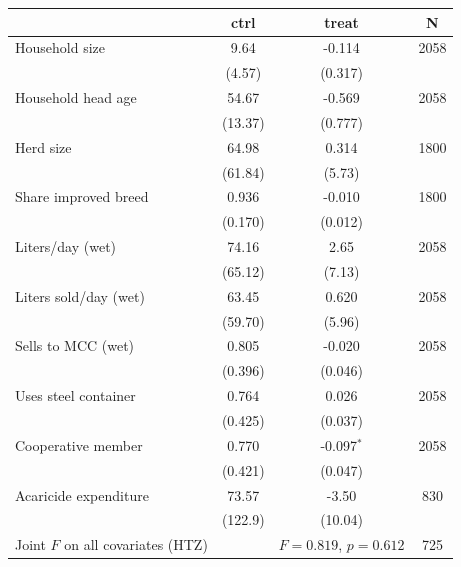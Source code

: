 \begin{tabular}{lccc}
\hline\hline
 & ctrl & treat & N \\
\hline
Household size & 9.64 & -0.114 & 2058 \\
 & (4.57) & (0.317) & \\
Household head age & 54.67 & -0.569 & 2058 \\
 & (13.37) & (0.777) & \\
Herd size & 64.98 & 0.314 & 1800 \\
 & (61.84) & (5.73) & \\
Share improved breed & 0.936 & -0.010 & 1800 \\
 & (0.170) & (0.012) & \\
Liters/day (wet) & 74.16 & 2.65 & 2058 \\
 & (65.12) & (7.13) & \\
Liters sold/day (wet) & 63.45 & 0.620 & 2058 \\
 & (59.70) & (5.96) & \\
Sells to MCC (wet) & 0.805 & -0.020 & 2058 \\
 & (0.396) & (0.046) & \\
Uses steel container & 0.764 & 0.026 & 2058 \\
 & (0.425) & (0.037) & \\
Cooperative member & 0.770 & -0.097$^{*}$ & 2058 \\
 & (0.421) & (0.047) & \\
Acaricide expenditure & 73.57 & -3.50 & 830 \\
 & (122.9) & (10.04) & \\
\hline
Joint $F$ on all covariates (HTZ) & & $F=0.819$, $p=0.612$ & 725 \\
\hline\hline
\end{tabular}
